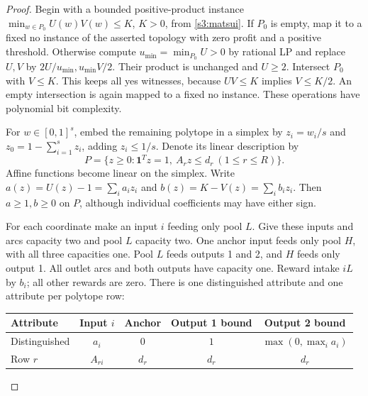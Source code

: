 \begin{proof}
Begin with a bounded positive-product instance
$\min_{w\in P_0}U(w)V(w)\le K$, $K>0$, from \cref{s3:matsui}.
If $P_0$ is empty, map it to a fixed no instance of the asserted topology
with zero profit and a positive threshold. Otherwise compute
$u_{\min}=\min_{P_0}U>0$ by rational LP and replace $U,V$ by
$2U/u_{\min},u_{\min}V/2$. Their product is unchanged and $U\ge2$.
Intersect $P_0$ with $V\le K$. This keeps all yes witnesses, because
$UV\le K$ implies $V\le K/2$. An empty intersection is again mapped
to a fixed no instance. These operations have polynomial bit complexity.

For $w\in[0,1]^s$, embed the remaining polytope in a simplex by
$z_i=w_i/s$ and $z_0=1-\sum_{i=1}^s z_i$, adding $z_i\le1/s$.
Denote its linear description by
\[
 P=\{z\ge0:\mathbf1^Tz=1,\ A_rz\le d_r\ (1\le r\le R)\}.
\]
Affine functions become linear on the simplex. Write
$a(z)=U(z)-1=\sum_i a_iz_i$ and $b(z)=K-V(z)=\sum_i b_iz_i$.
Then $a\ge1,b\ge0$ on $P$, although individual coefficients may
have either sign.

For each coordinate make an input $i$ feeding only pool $L$. Give these
inputs and arcs capacity two and pool $L$ capacity two. One anchor
input feeds only pool $H$, with all three capacities one. Pool $L$
feeds outputs 1 and 2, and $H$ feeds only output 1. All outlet arcs
and both outputs have capacity one. Reward intake $iL$ by $b_i$;
all other rewards are zero. There is one distinguished attribute and
one attribute per polytope row:
\begin{center}
\begin{tabular}{lcccc}
\toprule
Attribute & Input $i$ & Anchor & Output 1 bound & Output 2 bound\\
\midrule
Distinguished & $a_i$ & $0$ & $1$ & $\max(0,\max_i a_i)$\\
Row $r$ & $A_{ri}$ & $d_r$ & $d_r$ & $d_r$\\
\bottomrule
\end{tabular}
\end{center}


\end{proof}
